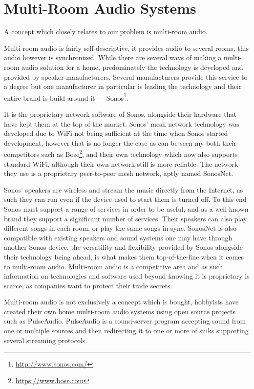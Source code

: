 \section{Multi-Room Audio Systems}
A concept which closely relates to our problem is multi-room audio.

Multi-room audio is fairly self-descriptive, it provides audio to several rooms, this audio however is synchronized.
While there are several ways of making a multi-room audio solution for a home, predominately the technology is developed and provided by speaker manufacturers.
Several manufacturers provide this service to a degree but one
manufacturer in particular is leading the technology and their entire brand is build around it --- Sonos\footnote{\url{http://www.sonos.com/}}.

It is the proprietary network software of Sonos, alongside their hardware that have kept them at the top of the market.
Sonos' mesh network technology was developed due to WiFi not being sufficient
at the time when Sonos started development, however that is no longer the case as can be seen my both their competitors such as Bose\footnote{\url{https://www.bose.com}}, and their own technology which now also supports standard WiFi, although their own network still is more reliable.\cite{sonos1}
The network they use is a proprietary peer-to-peer mesh network, aptly named SonosNet.\cite{sonosWiki}

Sonos' speakers are wireless and stream the music directly from the Internet, as such they can run even if the device used to start them is turned off.
To this end Sonos must support a range of services in order to be useful, and as a well-known brand they support a significant number of services.
Their speakers can also play different songs in each room, or play the same songs in sync.
SonosNet is also compatible with existing speakers and sound systems one may have through another Sonos device, the versatility and flexibility provided by Sonos alongside their technology being ahead, is what makes them top-of-the-line when it comes to multi-room audio.\cite{sonos2}
Multi-room audio is a competitive area and as such information on technologies and software used beyond knowing it is proprietary is scarce, as companies want to protect their trade secrets.

Multi-room audio is not exclusively a concept which is bought, hobbyists have created their own home multi-room audio systems using open source projects such as PulseAudio.\cite{pulseAudioHobbyist}
PulseAudio is a sound-server program accepting sound from one or multiple sources and then redirecting it to one or more of sinks supporting several streaming protocols.\cite{pulseAudioModules}

